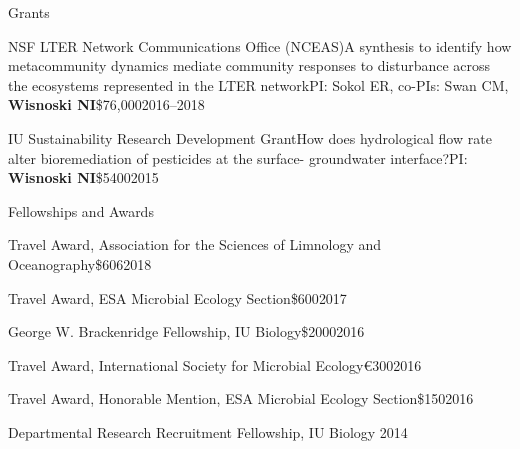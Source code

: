 \documentclass{resume} %
\begin{document}
\begin{rSection}{Grants}

\begin{Grant}{NSF LTER Network Communications Office (NCEAS)}{A synthesis to identify how metacommunity dynamics mediate community responses to disturbance across the ecosystems represented in the LTER network}{PI: Sokol ER, co-PIs: Swan CM, {\bf Wisnoski NI}}{\$76,000}{2016--2018}
\end{Grant}

\begin{Grant}{IU Sustainability Research Development Grant}{How does hydrological flow rate alter bioremediation of pesticides at the surface- groundwater interface?}{PI: {\bf Wisnoski NI}}{\$5400}{2015}
\end{Grant}

\end{rSection}

\bigskip


\begin{rSection}{Fellowships and Awards}

\begin{Award}{Travel Award, Association for the Sciences of Limnology and Oceanography}{\$606}{2018}
\end{Award}

\begin{Award}{Travel Award, ESA Microbial Ecology Section}{\$600}{2017}
\end{Award}

\begin{Award}{George W. Brackenridge Fellowship, IU Biology}{\$2000}{2016}
\end{Award}

\begin{Award}{Travel Award, International Society for Microbial Ecology}{\euro{}300}{2016}
\end{Award}

\begin{Award}{Travel Award, Honorable Mention, ESA Microbial Ecology Section}{\$150}{2016}
\end{Award}

\begin{Award}{Departmental Research Recruitment Fellowship, IU Biology}{ }{2014}
\end{Award}

\end{rSection}
\end{document}
